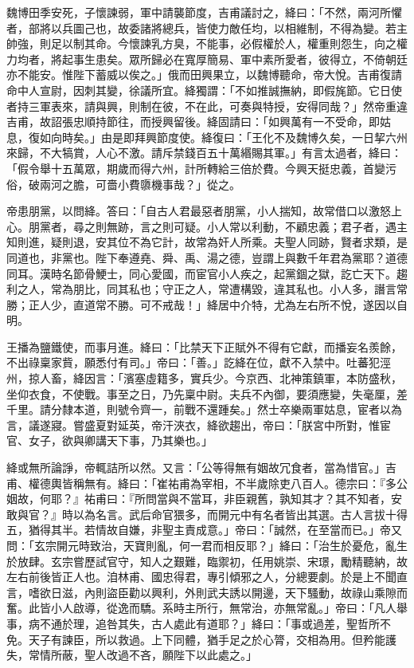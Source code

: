 \begin{pinyinscope}
 魏博田季安死，子懷諫弱，軍中請襲節度，吉甫議討之，絳曰：「不然，兩河所懼者，部將以兵圖己也，故委諸將總兵，皆使力敵任均，以相維制，不得為變。若主帥強，則足以制其命。今懷諫乳方臭，不能事，必假權於人，權重則怨生，向之權力均者，將起事生患矣。眾所歸必在寬厚簡易、軍中素所愛者，彼得立，不倚朝廷亦不能安。惟陛下蓄威以俟之。」俄而田興果立，以魏博聽命，帝大悅。吉甫復請命中人宣尉，因刺其變，徐議所宜。絳獨謂：「不如推誠撫納，即假旄節。它日使者持三軍表來，請與興，則制在彼，不在此，可奏與特授，安得同哉？」然帝重違吉甫，故詔張忠順持節往，而授興留後。絳固請曰：「如興萬有一不受命，即姑息，復如向時矣。」由是即拜興節度使。絳復曰：「王化不及魏博久矣，一日挈六州來歸，不大犒賞，人心不激。請斥禁錢百五十萬緡賜其軍。」有言太過者，絳曰：「假令舉十五萬眾，期歲而得六州，計所轉給三倍於費。今興天挺忠義，首變污俗，破兩河之膽，可嗇小費隳機事哉？」從之。



 帝患朋黨，以問絳。答曰：「自古人君最惡者朋黨，小人揣知，故常借口以激怒上心。朋黨者，尋之則無跡，言之則可疑。小人常以利動，不顧忠義；君子者，遇主知則進，疑則退，安其位不為它計，故常為奸人所乘。夫聖人同跡，賢者求類，是同道也，非黨也。陛下奉遵堯、舜、禹、湯之德，豈謂上與數千年君為黨耶？道德同耳。漢時名節骨鯁士，同心愛國，而宦官小人疾之，起黨錮之獄，訖亡天下。趨利之人，常為朋比，同其私也；守正之人，常遭構毀，違其私也。小人多，譖言常勝；正人少，直道常不勝。可不戒哉！」絳居中介特，尤為左右所不悅，遂因以自明。



 王播為鹽鐵使，而事月進。絳曰：「比禁天下正賦外不得有它獻，而播妄名羨餘，不出祿稟家貲，願悉付有司。」帝曰：「善。」訖絳在位，獻不入禁中。吐蕃犯涇州，掠人畜，絳因言：「濱塞虛籍多，實兵少。今京西、北神策鎮軍，本防盛秋，坐仰衣食，不使戰。事至之日，乃先稟中尉。夫兵不內御，要須應變，失毫厘，差千里。請分隸本道，則號令齊一，前戰不還踵矣。」然士卒樂兩軍姑息，宦者以為言，議遂寢。嘗盛夏對延英，帝汗浹衣，絳欲趨出，帝曰：「朕宮中所對，惟宦官、女子，欲與卿講天下事，乃其樂也。」



 絳或無所論諍，帝輒詰所以然。又言：「公等得無有姻故冗食者，當為惜官。」吉甫、權德輿皆稱無有。絳曰：「崔祐甫為宰相，不半歲除吏八百人。德宗曰：『多公姻故，何耶？』祐甫曰：『所問當與不當耳，非臣親舊，孰知其才？其不知者，安敢與官？』時以為名言。武后命官猥多，而開元中有名者皆出其選。古人言拔十得五，猶得其半。若情故自嫌，非聖主責成意。」帝曰：「誠然，在至當而已。」帝又問：「玄宗開元時致治，天寶則亂，何一君而相反耶？」絳曰：「治生於憂危，亂生於放肆。玄宗嘗歷試官守，知人之艱難，臨禦初，任用姚崇、宋璟，勵精聽納，故左右前後皆正人也。洎林甫、國忠得君，專引傾邪之人，分總要劇。於是上不聞直言，嗜欲日滋，內則盜臣勸以興利，外則武夫誘以開邊，天下騷動，故祿山乘隙而奮。此皆小人啟導，從逸而驕。系時主所行，無常治，亦無常亂。」帝曰：「凡人舉事，病不通於理，追咎其失，古人處此有道耶？」絳曰：「事或過差，聖哲所不免。天子有諫臣，所以救過。上下同體，猶手足之於心膂，交相為用。但矜能護失，常情所蔽，聖人改過不吝，願陛下以此處之。」




\end{pinyinscope}
